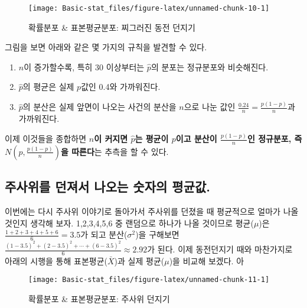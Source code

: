 \documentclass[]{book}
\providecommand{\tightlist}{%
  \setlength{\itemsep}{0pt}\setlength{\parskip}{0pt}}
\begin{document}
\begin{figure}

{\centering \texttt{[image: Basic-stat\_files/figure-latex/unnamed-chunk-10-1]} 

}

\caption{확률분포 & 표본평균분포: 찌그러진 동전 던지기}\label{fig:unnamed-chunk-10}
\end{figure}

그림을 보면 아래와 같은 몇 가지의 규칙을 발견할 수 있다.

\begin{enumerate}
\def\labelenumi{\arabic{enumi}.}
\tightlist
\item
  \(n\)이 증가할수록, 특히 30 이상부터는 \(\hat{p}\)의 분포는 정규분포와 비슷해진다.
\item
  \(\hat{p}\)의 평균은 실제 \(p\)값인 0.4와 가까워진다.
\item
  \(\hat{p}\)의 분산은 실제 앞면이 나오는 사건의 분산을 \(n\)으로 나눈 값인 \(\frac{0.24}{n}=\frac{p(1-p)}{n}\)과 가까워진다.
\end{enumerate}

이제 이것들을 종합하면 \textbf{\(n\)이 커지면 \(\hat{p}\)는 평균이 \(p\)이고 분산이 \(\frac{p(1-p)}{n}\)인 정규분포, 즉 \(N(p,\frac{p(1-p)}{n})\)을 따른다}는 추측을 할 수 있다.

\hypertarget{uxc8fcuxc0acuxc704uxb97c-uxb358uxc838uxc11c-uxb098uxc624uxb294-uxc22buxc790uxc758-uxd3c9uxade0uxac12.}{%
\subsection{주사위를 던져서 나오는 숫자의 평균값.}\label{uxc8fcuxc0acuxc704uxb97c-uxb358uxc838uxc11c-uxb098uxc624uxb294-uxc22buxc790uxc758-uxd3c9uxade0uxac12.}}

이번에는 다시 주사위 이야기로 돌아가서 주사위를 던졌을 때 평균적으로 얼마가 나올 것인지 생각해 보자. 1,2,3,4,5,6
중 랜덤으로 하나가 나올 것이므로 평균(\(\mu\))은 \(\frac{1+2+3+4+5+6}{6}=3.5\)가 되고 분산(\(\sigma^2\))을 구해보면 \(\frac{(1-3.5)^2+(2-3.5)^2+\cdots+(6-3.5)^2}{6}\approx 2.92\)가 된다. 이제 동전던지기 때와 마찬가지로 아래의 시행을 통해 표본평균(\(\bar{X}\))과 실제 평균(\(\mu\))을 비교해 보겠다.
아

\begin{figure}

{\centering \texttt{[image: Basic-stat\_files/figure-latex/unnamed-chunk-11-1]} 

}

\caption{확률분포 & 표본평균분포: 주사위 던지기}\label{fig:unnamed-chunk-11}
\end{figure}
\end{document}
